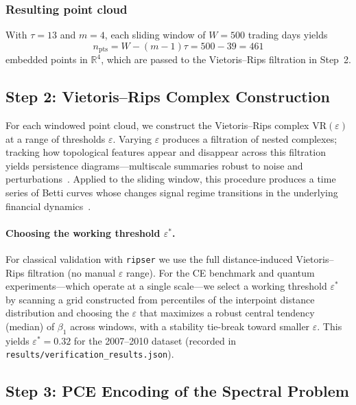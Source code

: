 \documentclass[conference,10pt]{IEEEtran}
\begin{document}
\subsubsection{Resulting point cloud}
With $\tau = 13$ and $m = 4$, each sliding window of $W = 500$
trading days yields
\begin{equation}
    n_{\mathrm{pts}} = W - (m-1)\tau = 500 - 39 = 461
\end{equation}
embedded points in $\mathbb{R}^4$, which are passed to the
Vietoris--Rips filtration in Step~2.

\subsection{Step 2: Vietoris--Rips Complex Construction}

For each windowed point cloud, we construct the Vietoris--Rips complex
$\mathrm{VR}(\varepsilon)$ at a range of thresholds $\varepsilon$.
Varying $\varepsilon$ produces a filtration of nested complexes;
tracking how topological features appear and disappear across this
filtration yields persistence diagrams---multiscale summaries robust
to noise and perturbations~\cite{EH10, ZC05}. Applied to the sliding
window, this procedure produces a time series of Betti curves whose
changes signal regime transitions in the underlying financial
dynamics~\cite{GK18}.

\paragraph*{Choosing the working threshold $\varepsilon^*$.}
For classical validation with \texttt{ripser} we use the full
distance-induced Vietoris--Rips filtration (no manual $\varepsilon$
range). For the CE benchmark and quantum experiments---which operate
at a single scale---we select a working threshold $\varepsilon^*$ by
scanning a grid constructed from percentiles of the interpoint
distance distribution and choosing the $\varepsilon$ that maximizes a
robust central tendency (median) of $\beta_1$ across windows, with a
stability tie-break toward smaller $\varepsilon$. This yields
$\varepsilon^* = 0.32$ for the 2007--2010 dataset (recorded in
\texttt{results/verification\_results.json}).

\subsection{Step 3: PCE Encoding of the Spectral Problem}
\label{sec:pce_encoding}
\end{document}
